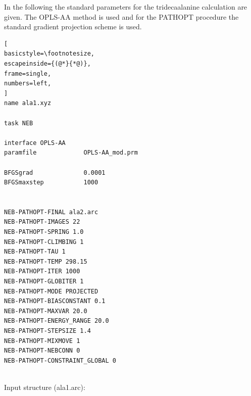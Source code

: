 \documentclass[a4paper,11pt]{scrartcl}
\begin{document}
In the following the standard parameters for the tridecaalanine calculation are given. The OPLS-AA method is used and for the PATHOPT procedure the standard gradient projection scheme is used. 

\begin{lstlisting}[
basicstyle=\footnotesize,
escapeinside={(@*}{*@)},
frame=single,
numbers=left,
]
name ala1.xyz

task NEB

interface OPLS-AA
paramfile             OPLS-AA_mod.prm

BFGSgrad              0.0001
BFGSmaxstep           1000


NEB-PATHOPT-FINAL ala2.arc
NEB-PATHOPT-IMAGES 22
NEB-PATHOPT-SPRING 1.0
NEB-PATHOPT-CLIMBING 1
NEB-PATHOPT-TAU 1
NEB-PATHOPT-TEMP 298.15
NEB-PATHOPT-ITER 1000
NEB-PATHOPT-GLOBITER 1
NEB-PATHOPT-MODE PROJECTED
NEB-PATHOPT-BIASCONSTANT 0.1
NEB-PATHOPT-MAXVAR 20.0
NEB-PATHOPT-ENERGY_RANGE 20.0
NEB-PATHOPT-STEPSIZE 1.4
NEB-PATHOPT-MIXMOVE 1 
NEB-PATHOPT-NEBCONN 0
NEB-PATHOPT-CONSTRAINT_GLOBAL 0


\end{lstlisting}

Input structure (ala1.arc): \newline
\end{document}
